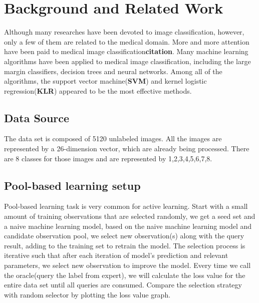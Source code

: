 \documentclass{article}
\begin{document}
 

\section{Background and Related Work}
Although many researches have been devoted to image classification, however, only a few of them are related to the medical domain. More and more attention have been paid to medical image classification\textbf{citation}. Many machine learning algorithms have been applied to medical image classification, including the large margin classifiers, decision trees and neural networks. Among all of the algorithms, the support vector machine(\textbf{SVM}) and kernel logistic regression(\textbf{KLR}) appeared to be the most effective methods\cite{hoi2006batch}.

\subsection{Data Source}
The data set is composed of 5120 unlabeled images. All the images are represented by a 26-dimension vector, which are already being processed. There are 8 classes for those images and are represented by 1,2,3,4,5,6,7,8.
\subsection{Pool-based learning setup}
Pool-based learning task is very common for active learning. Start with a small amount of training observations that are selected randomly, we get a seed set and a naive machine learning model, based on the naive machine learning model and candidate observation pool, we select new observation(s) along with the query result, adding to the training set to retrain the model. The selection process is iterative such that after each iteration of model's prediction and relevant parameters, we select new observation to improve the model. Every time we call the oracle(query the label from expert), we will calculate the loss value for the entire data set until all queries are consumed. Compare the selection strategy with random selector by plotting the loss value graph.
\end{document}
